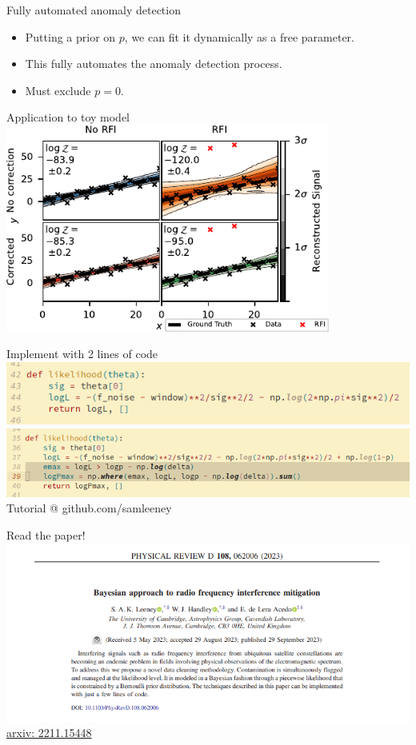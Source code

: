 \documentclass[aspectratio=169]{beamer}
\begin{document}
\begin{frame}{Fully automated anomaly detection}
  \begin{itemize}
  \item Putting a prior on $p$, we can fit it dynamically as a free parameter.
  \item This fully automates the anomaly detection process.
  \item Must exclude $p=0$.
  \end{itemize}
\end{frame}

\begin{frame}{Application to toy model}
  \centering
  \includegraphics[width=0.8\textwidth]{images/4pane_toy_sidebar.pdf}
\end{frame}

\begin{frame}{Implement with 2 lines of code}
  \includegraphics[width=1\textwidth]{images/logl1.png}
  \includegraphics[width=1\textwidth]{images/logl2.png}
  \centering Tutorial @ github.com/samleeney
\end{frame}

\begin{frame}{Read the paper!}
  \includegraphics[width=1\textwidth]{images/paper1.png}
  \href{https://arxiv.org/abs/2211.15448}{arxiv: 2211.15448}
\end{frame}
\end{document}
